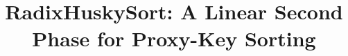 \documentclass[twoside,leqno,twocolumn]{article}
\date{ }
\begin{document}
\title{RadixHuskySort: A Linear Second Phase for Proxy-Key Sorting}










 
 















\maketitle
\end{document}

